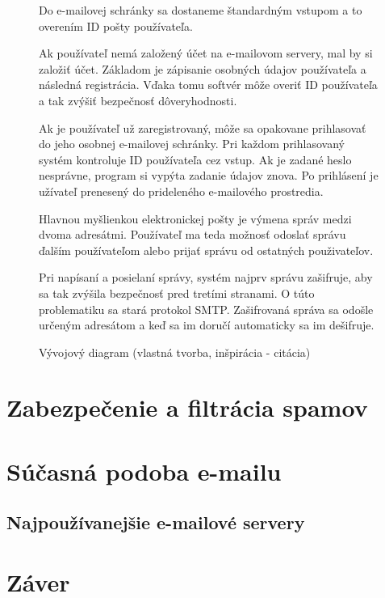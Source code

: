 \documentclass[10pt,slovak,twoside,a4paper]{article}
\begin{document}
\begin{figure}[h]
\begin{minipage}[b]{.40\textwidth}
\caption{Vývojový diagram \newline (vlastná tvorba, inšpirácia - citácia)\cite{Acharya_smartmailing}}
\end{minipage}
\begin{minipage}[b]{.40\textwidth}
Do e-mailovej schránky sa dostaneme štandardným vstupom a to overením ID pošty používateľa.
\begin{flushleft}
Ak používateľ nemá založený účet na e-mailovom servery, mal by si založiť účet. Základom je zápisanie osobných údajov používateľa a následná registrácia. Vďaka tomu softvér môže overiť ID používateľa a tak zvýšiť bezpečnosť dôveryhodnosti.
\end{flushleft}
Ak je používateľ už zaregistrovaný, môže sa opakovane prihlasovať do jeho osobnej e-mailovej schránky. Pri každom prihlasovaný systém kontroluje ID používateľa cez vstup. Ak je zadané heslo nesprávne, program si vypýta zadanie údajov znova. 
Po prihlásení je užívateľ prenesený do prideleného e-mailového prostredia. 
\begin{flushleft}
Hlavnou myšlienkou elektronickej pošty je výmena správ medzi dvoma adresátmi. Používateľ ma teda možnosť odoslať správu ďalším používateľom alebo prijať správu od ostatných použivateľov. 
\end{flushleft}
\begin{flushleft}
Pri napísaní a posielaní správy, systém najprv správu zašifruje, aby sa tak zvýšila bezpečnosť pred tretími stranami. O túto problematiku sa stará protokol SMTP. Zašifrovaná správa sa odošle určeným adresátom a keď sa im doručí automaticky sa im dešifruje.\cite{Acharya_smartmailing}
\end{flushleft}
\end{minipage}
\end{figure}

\newpage

\section{Zabezpečenie a filtrácia spamov} 

\section{Súčasná podoba e-mailu} 

\subsection{Najpoužívanejšie e-mailové servery} 

\section{Záver} \label{zaver} %




\newpage


\end{document}
